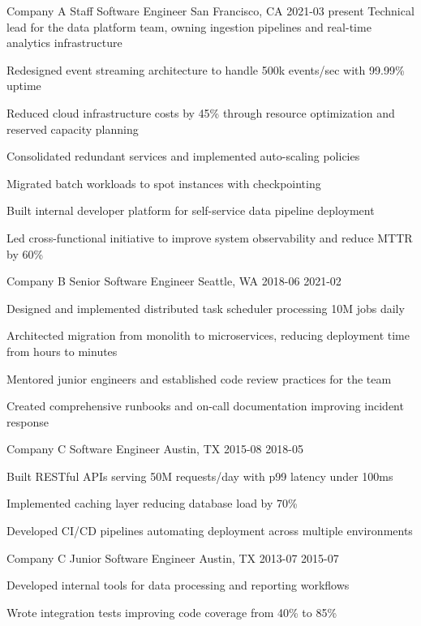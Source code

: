 \begin{experience}
  \expentry
    {Company A}
    {Staff Software Engineer}
    {San Francisco, CA}
    {2021-03}
    {present}
    {Technical lead for the data platform team, owning ingestion pipelines and real-time analytics infrastructure}
    {
      \item Redesigned event streaming architecture to handle 500k events/sec with 99.99\% uptime
      \item Reduced cloud infrastructure costs by 45\% through resource optimization and reserved capacity planning
        \begin{expsubentry}
          \item Consolidated redundant services and implemented auto-scaling policies
          \item Migrated batch workloads to spot instances with checkpointing
        \end{expsubentry}
      \item Built internal developer platform for self-service data pipeline deployment
      \item Led cross-functional initiative to improve system observability and reduce MTTR by 60\%
    }

  \expentry
    {Company B}
    {Senior Software Engineer}
    {Seattle, WA}
    {2018-06}
    {2021-02}
    {}
    {
      \item Designed and implemented distributed task scheduler processing 10M jobs daily
      \item Architected migration from monolith to microservices, reducing deployment time from hours to minutes
      \item Mentored junior engineers and established code review practices for the team
      \item Created comprehensive runbooks and on-call documentation improving incident response
    }

  \expentry
    {Company C}
    {Software Engineer}
    {Austin, TX}
    {2015-08}
    {2018-05}
    {}
    {
      \item Built RESTful APIs serving 50M requests/day with p99 latency under 100ms
      \item Implemented caching layer reducing database load by 70\%
      \item Developed CI/CD pipelines automating deployment across multiple environments
    }

  \expentry
    {Company C}
    {Junior Software Engineer}
    {Austin, TX}
    {2013-07}
    {2015-07}
    {}
    {
      \item Developed internal tools for data processing and reporting workflows
      \item Wrote integration tests improving code coverage from 40\% to 85\%
    }
\end{experience}
